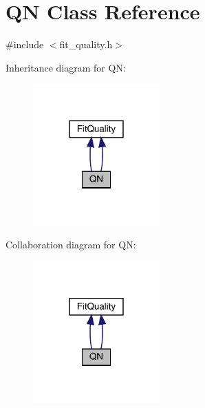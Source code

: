 \hypertarget{classQN}{}\section{QN Class Reference}
\label{classQN}


{\ttfamily \#include $<$fit\+\_\+quality.\+h$>$}



Inheritance diagram for QN\+:
\nopagebreak
\begin{figure}[H]
\begin{center}
\leavevmode
\includegraphics[width=138pt]{d6/d79/classQN__inherit__graph}
\end{center}
\end{figure}


Collaboration diagram for QN\+:
\nopagebreak
\begin{figure}[H]
\begin{center}
\leavevmode
\includegraphics[width=138pt]{d7/d69/classQN__coll__graph}
\end{center}
\end{figure}
